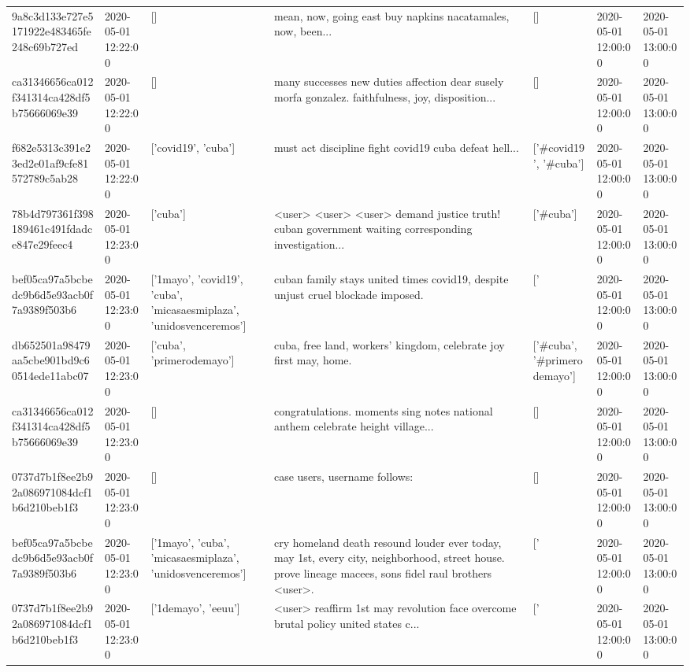 \begin{tabular}{lllllll}
9a8c3d133e727e5171922e483465fe248c69b727ed & 2020-05-01 12:22:00 & [] & mean, now, going east buy napkins nacatamales, now, been... & [] & 2020-05-01 12:00:00 & 2020-05-01 13:00:00 \\
ca31346656ca012f341314ca428df5b75666069e39 & 2020-05-01 12:22:00 & [] & many successes new duties affection dear susely morfa gonzalez. faithfulness, joy, disposition... & [] & 2020-05-01 12:00:00 & 2020-05-01 13:00:00 \\
f682e5313c391e23ed2e01af9cfe81572789c5ab28 & 2020-05-01 12:22:00 & ['covid19', 'cuba'] & must act discipline fight covid19 cuba defeat hell... & ['#covid19', '#cuba'] & 2020-05-01 12:00:00 & 2020-05-01 13:00:00 \\
78b4d797361f398189461c491fdadce847e29feec4 & 2020-05-01 12:23:00 & ['cuba'] & <user> <user> <user> demand justice truth! cuban government waiting corresponding investigation... & ['#cuba'] & 2020-05-01 12:00:00 & 2020-05-01 13:00:00 \\
bef05ca97a5bcbedc9b6d5e93acb0f7a9389f503b6 & 2020-05-01 12:23:00 & ['1mayo', 'covid19', 'cuba', 'micasaesmiplaza', 'unidosvenceremos'] & cuban family stays united times covid19, despite unjust cruel blockade imposed. & ['#1mayo', '#covid19', '#cuba', '#micasaesmiplaza', '#unidosvenceremos'] & 2020-05-01 12:00:00 & 2020-05-01 13:00:00 \\
db652501a98479aa5cbe901bd9c60514ede11abc07 & 2020-05-01 12:23:00 & ['cuba', 'primerodemayo'] & cuba, free land, workers' kingdom, celebrate joy first may, home. & ['#cuba', '#primerodemayo'] & 2020-05-01 12:00:00 & 2020-05-01 13:00:00 \\
ca31346656ca012f341314ca428df5b75666069e39 & 2020-05-01 12:23:00 & [] & congratulations. moments sing notes national anthem celebrate height village... & [] & 2020-05-01 12:00:00 & 2020-05-01 13:00:00 \\
0737d7b1f8ee2b92a086971084dcf1b6d210beb1f3 & 2020-05-01 12:23:00 & [] & case users, username follows: & [] & 2020-05-01 12:00:00 & 2020-05-01 13:00:00 \\
bef05ca97a5bcbedc9b6d5e93acb0f7a9389f503b6 & 2020-05-01 12:23:00 & ['1mayo', 'cuba', 'micasaesmiplaza', 'unidosvenceremos'] & cry homeland death resound louder ever today, may 1st, every city, neighborhood, street house. prove lineage macees, sons fidel raul brothers <user>. & ['#1mayo', '#cuba', '#micasaesmiplaza', '#unidosvenceremos'] & 2020-05-01 12:00:00 & 2020-05-01 13:00:00 \\
0737d7b1f8ee2b92a086971084dcf1b6d210beb1f3 & 2020-05-01 12:23:00 & ['1demayo', 'eeuu'] & <user> reaffirm 1st may revolution face overcome brutal policy united states c... & ['#1demayo', '#eeuu'] & 2020-05-01 12:00:00 & 2020-05-01 13:00:00 \\

\end{tabular}
